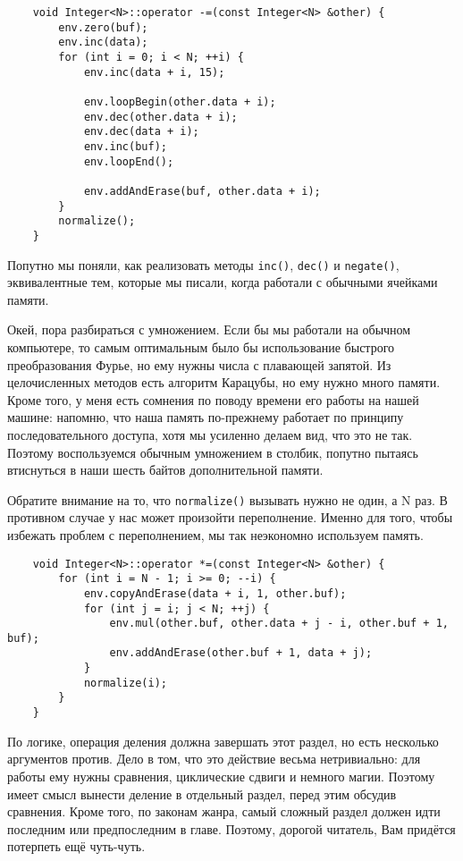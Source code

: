 \documentclass{book}
\begin{document}
\begin{verbatim}
    void Integer<N>::operator -=(const Integer<N> &other) {
        env.zero(buf);
        env.inc(data);
        for (int i = 0; i < N; ++i) {
            env.inc(data + i, 15);

            env.loopBegin(other.data + i);
            env.dec(other.data + i);
            env.dec(data + i);
            env.inc(buf);
            env.loopEnd();

            env.addAndErase(buf, other.data + i);
        }
        normalize();
    }
\end{verbatim}

Попутно мы поняли, как реализовать методы \texttt{inc()}, \texttt{dec()} и \texttt{negate()}, эквивалентные тем, которые мы писали,
когда работали с обычными ячейками памяти. 

Окей, пора разбираться с умножением. Если бы мы работали на обычном компьютере, то самым оптимальным было бы использование быстрого
преобразования Фурье, но ему нужны числа с плавающей запятой. Из целочисленных методов есть алгоритм Карацубы, но ему нужно много
памяти. Кроме того, у меня есть сомнения по поводу времени его работы на нашей машине: напомню, что наша память по-прежнему работает
по принципу последовательного доступа, хотя мы усиленно делаем вид, что это не так. Поэтому воспользуемся обычным умножением в столбик,
попутно пытаясь втиснуться в наши шесть байтов дополнительной памяти.

Обратите внимание на то, что \texttt{normalize()} вызывать нужно не один, а N раз. В противном случае у нас может произойти
переполнение. Именно для того, чтобы избежать проблем с переполнением, мы так неэкономно используем память.

\begin{verbatim}
    void Integer<N>::operator *=(const Integer<N> &other) {
        for (int i = N - 1; i >= 0; --i) {
            env.copyAndErase(data + i, 1, other.buf);
            for (int j = i; j < N; ++j) {
                env.mul(other.buf, other.data + j - i, other.buf + 1, buf);
                env.addAndErase(other.buf + 1, data + j);
            }
            normalize(i); 
        }
    }
\end{verbatim}

По логике, операция деления должна завершать этот раздел, но есть несколько аргументов против. Дело в том, что это действие весьма
нетривиально: для работы ему нужны сравнения, циклические сдвиги и немного магии. Поэтому имеет смысл вынести деление в отдельный
раздел, перед этим обсудив сравнения. Кроме того, по законам жанра, самый сложный раздел должен идти последним или предпоследним
в главе. Поэтому, дорогой читатель, Вам придётся потерпеть ещё чуть-чуть.
\end{document}
